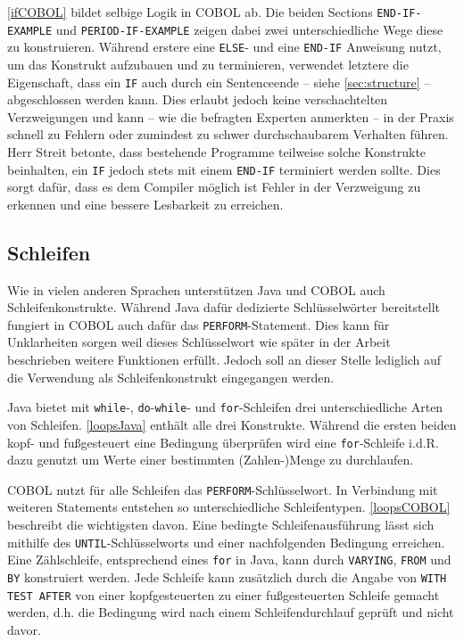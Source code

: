 \autoref{ifCOBOL} bildet selbige Logik in COBOL ab. Die beiden Sections \texttt{END-IF-EXAMPLE} und \texttt{PERIOD-IF-EXAMPLE} zeigen dabei zwei unterschiedliche Wege diese zu konstruieren. Während erstere eine \texttt{ELSE}- und eine \texttt{END-IF} Anweisung nutzt, um das Konstrukt aufzubauen und zu terminieren, verwendet letztere die Eigenschaft, dass ein \texttt{IF} auch durch ein Sentenceende -- siehe \autoref{sec:structure} -- abgeschlossen werden kann. Dies erlaubt jedoch keine verschachtelten Verzweigungen und kann -- wie die befragten Experten anmerkten -- in der Praxis schnell zu Fehlern oder zumindest zu schwer durchschaubarem Verhalten führen. Herr Streit betonte, dass bestehende Programme teilweise solche Konstrukte beinhalten, ein \texttt{IF} jedoch stets mit einem \texttt{END-IF} terminiert werden sollte. Dies sorgt dafür, dass es dem Compiler möglich ist Fehler in der Verzweigung zu erkennen und eine bessere Lesbarkeit zu erreichen.

\subsection{Schleifen}

Wie in vielen anderen Sprachen unterstützen Java und COBOL auch Schleifenkonstrukte. Während Java dafür dedizierte Schlüsselwörter bereitstellt fungiert in COBOL auch dafür das \texttt{PERFORM}-Statement. Dies kann für Unklarheiten sorgen weil dieses Schlüsselwort wie später in der Arbeit beschrieben weitere Funktionen erfüllt. Jedoch soll an dieser Stelle lediglich auf die Verwendung als Schleifenkonstrukt eingegangen werden.

Java bietet mit \texttt{while}-, \texttt{do}-\texttt{while}- und \texttt{for}-Schleifen drei unterschiedliche Arten von Schleifen. \autoref{loopsJava} enthält alle drei Konstrukte. Während die ersten beiden kopf- und fußgesteuert eine Bedingung überprüfen wird eine \texttt{for}-Schleife i.d.R. dazu genutzt um Werte einer bestimmten (Zahlen-)Menge zu durchlaufen.


COBOL nutzt für alle Schleifen das \texttt{PERFORM}-Schlüsselwort. In Verbindung mit weiteren Statements entstehen so unterschiedliche Schleifentypen. \autoref{loopsCOBOL} beschreibt die wichtigsten davon. Eine bedingte Schleifenausführung lässt sich mithilfe des \texttt{UNTIL}-Schlüsselworts und einer nachfolgenden Bedingung erreichen. Eine Zählschleife, entsprechend eines \texttt{for} in Java, kann durch \texttt{VARYING}, \texttt{FROM} und \texttt{BY} konstruiert werden. Jede Schleife kann zusätzlich durch die Angabe von \texttt{WITH TEST AFTER} von einer kopfgesteuerten zu einer fußgesteuerten Schleife gemacht werden, d.h. die Bedingung wird nach einem Schleifendurchlauf geprüft und nicht davor.

